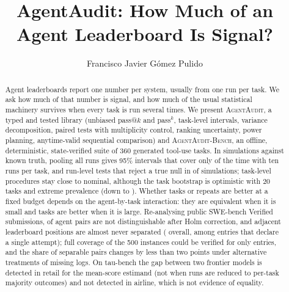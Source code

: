 \documentclass[10pt]{article}
\title{AgentAudit: How Much of an Agent Leaderboard Is Signal?}
\author{\name Francisco Javier G\'omez Pulido}
\newcommand{\REALABSTRACT}{}
\begin{document}
\maketitle

\begin{abstract}
Agent leaderboards report one number per system, usually from one run per task. We ask how much of that number is signal, and how much of the usual statistical machinery survives when every task is run several times. We present \textsc{AgentAudit}, a typed and tested library (unbiased pass@$k$ and pass$^k$, task-level intervals, variance decomposition, paired tests with multiplicity control, ranking uncertainty, power planning, anytime-valid sequential comparison) and \textsc{AgentAudit-Bench}, an offline, deterministic, state-verified suite of 360 generated tool-use tasks. In simulations against known truth, pooling all runs gives 95\% intervals that cover only \covWilsonTenRuns{} of the time with ten runs per task, and run-level tests that reject a true null in \typeIPoolMc{} of simulations; task-level procedures stay close to nominal, although the task bootstrap is optimistic with 20 tasks and extreme prevalence (down to \covrobBootSmallMin{}). Whether tasks or repeats are better at a fixed budget depends on the agent-by-task interaction: they are equivalent when it is small and tasks are better when it is large. Re-analysing \sweNAgents{} public SWE-bench Verified submissions, \sweIndistHolm{} of agent pairs are not distinguishable after Holm correction, and adjacent leaderboard positions are almost never separated (\sweAllAdjHolm{} overall, \sweSingleAdjHolm{} among entries that declare a single attempt); full coverage of the 500 instances could be verified for only \sweNCovered{} entries, and the share of separable pairs changes by less than two points under alternative treatments of missing logs. On tau-bench the gap between two frontier models is detected in retail for the mean-score estimand (not when runs are reduced to per-task majority outcomes) and not detected in airline, which is not evidence of equality. \REALABSTRACT
\end{abstract}













\appendix

\end{document}
